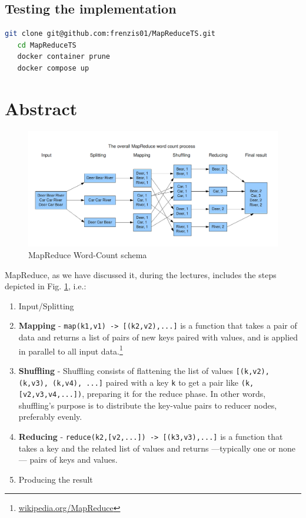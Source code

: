 \subsection*{Testing the implementation}
\begin{lstlisting}[language=bash]
   git clone git@github.com:frenzis01/MapReduceTS.git
   cd MapReduceTS
   docker container prune
   docker compose up
\end{lstlisting}
\newpage

\section{Abstract}
\begin{figure}[htbp]
   \centering
   \includegraphics[width=\columnwidth]{images/mapreduce.png}
   \caption{MapReduce Word-Count schema}
   \label{fig:mapreduce}
\end{figure}

{MapReduce, as we have discussed it, during the lectures, includes the steps depicted in Fig. \ref{fig:mapreduce}, i.e.:\ns
\begin{enumerate}
   \item Input/Splitting
   \item \textbf{Mapping} - \lstinline{map(k1,v1) -> [(k2,v2),...]} is a function that takes a pair of data and returns a list of pairs of new keys paired with values, and is applied in parallel to all input data.\footnote{\href{https://en.wikipedia.org/wiki/MapReduce}{wikipedia.org/MapReduce}}
   \item \textbf{Shuffling} - Shuffling consists of flattening the list of values \lstinline{[(k,v2), (k,v3), (k,v4), ...]} paired with a key \texttt{k} to get a pair like \lstinline|(k,[v2,v3,v4,...])|, preparing it for the reduce phase. In other words, shuffling's purpose is to distribute the key-value pairs to reducer nodes, preferably evenly. 
   \item \textbf{Reducing} - \lstinline|reduce(k2,[v2,...]) -> [(k3,v3),...]| is a function that takes a key and the related list of values and returns ---typically one or none--- pairs of keys and values. 
   \item Producing the result
\end{enumerate}}

